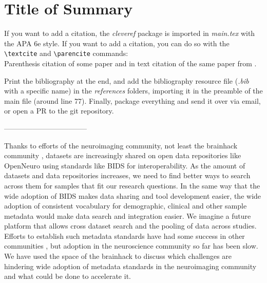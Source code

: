 \documentclass[../main.tex]{subfiles}
\begin{document}
\section{Title of Summary}





If you want to add a citation, the \emph{cleveref} package is imported in \emph{main.tex} with the APA 6e style. If you want to add a citation, you can do so with the \verb|\textcite| and \verb|\parencite| commands: \\
Parenthesis citation of some paper \parencite{Gau2021} and in text citation of the same paper from \textcite{Gau2021}.

Print the bibliography at the end, and add the bibliography resource file (\emph{.bib} with a specific name) in the \emph{references} folders, importing it in the preamble of the main file (around line 77).
Finally, package everything and send it over via email, or open a PR to the git repository.

-----------------------------------

Thanks to efforts of the neuroimaging community, not least the brainhack community \parencite{Gau2021}, datasets are increasingly shared on open data repositories like OpenNeuro \parencite{Markiewicz2021-bf} using standards like BIDS \parencite{Gorgolewski2016-bp} for interoperability. As the amount of datasets and data repositories increases, we need to find better ways to search across them for samples that fit our research questions. In the same way that the wide adoption of BIDS makes data sharing and tool development easier, the wide adoption of consistent vocabulary for demographic, clinical and other sample metadata would make data search and integration easier. We imagine a future platform that allows cross dataset search and the pooling of data across studies. Efforts to establish such metadata standards have had some success in other communities \parencite{Field2008-kw, Stang2010-nl}, but adoption in the neuroscience community so far has been slow. We have used the space of the brainhack to discuss which challenges are hindering wide adoption of metadata standards in the neuroimaging community and what could be done to accelerate it.
\end{document}
